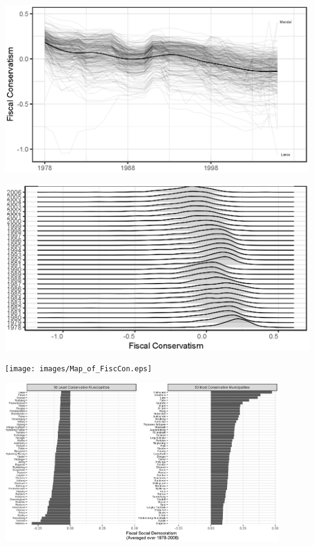 \documentclass[10pt,aspectratio=169]{beamer}
\begin{document}
\begin{frame}

\end{frame}

\begin{frame}
	\includegraphics[width=1\textwidth]{images/newtimes_lines.eps}
\end{frame}

\begin{frame}
	\includegraphics[width=1\textwidth]{images/newJoyPlotFiscal.eps}
\end{frame}

\begin{frame}	
	\texttt{[image: images/Map\_of\_FiscCon.eps]}
\end{frame}

\begin{frame}			
	\includegraphics[width=0.9\textwidth]{images/socialdemocratism.eps}
\end{frame}
\end{document}
